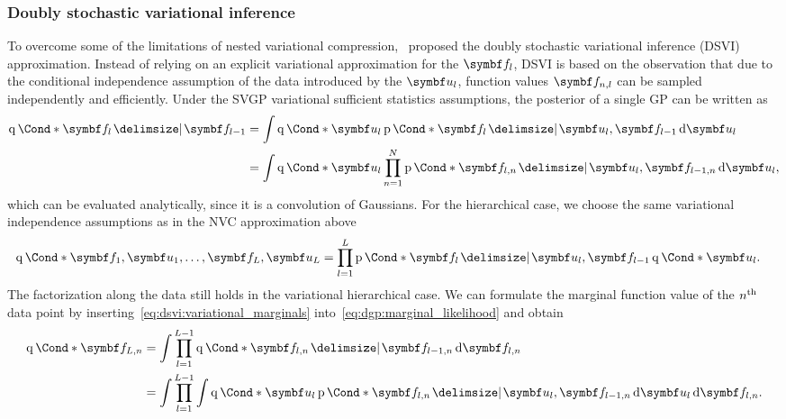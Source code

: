 \subsubsection{Doubly stochastic variational inference}
\label{toc:dsvi}
To overcome some of the limitations of nested variational compression,~\textcite{salimbeni_doubly_2017} proposed the doubly stochastic variational inference (DSVI) approximation.
Instead of relying on an explicit variational approximation for the $\mat{f}_l$, DSVI is based on the observation that due to the conditional independence assumption of the data introduced by the $\mat{u}_l$, function values $\mat{f}_{n,l}$ can be sampled independently and efficiently.
Under the SVGP variational sufficient statistics assumptions, the posterior of a single GP can be written as
\begin{equation}
    \begin{split}
        \label{eq:dsvi:variational_marginals}
        \Variat*{\mat{f}_l \given \mat{f}_{l-1}}
        &=
        \int \Variat*{\mat{u}_l}
        \Prob*{\mat{f}_l \given \mat{u}_l, \mat{f}_{l-1}}
        \diff \mat{u}_l
        \\
        &=
        \int \Variat*{\mat{u}_l}
        \prod_{n=1}^N \Prob*{\mat{f}_{l,n} \given \mat{u}_l, \mat{f}_{l-1, n}}
        \diff \mat{u}_l,
    \end{split}
\end{equation}
which can be evaluated analytically, since it is a convolution of Gaussians.
For the hierarchical case, we choose the same variational independence assumptions as in the NVC approximation above
\begin{equation}
    \begin{split}
        \label{eq:dsvi:variational_distribution}
        \Variat*{\mat{f}_1, \mat{u}_1, \dots, \mat{f}_L, \mat{u}_L}
        &= \prod_{l=1}^L \Prob*{\mat{f}_l \given \mat{u}_l, \mat{f}_{l-1}} \Variat*{\mat{u}_l}.
    \end{split}
\end{equation}
The factorization along the data still holds in the variational hierarchical case.
We can formulate the marginal function value of the $n^{\text{th}}$ data point by inserting~\cref{eq:dsvi:variational_marginals} into~\cref{eq:dgp:marginal_likelihood} and obtain
\begin{equation}
    \begin{split}
        \label{eq:dsvi:variational_layers}
        \Variat*{\mat{f}_{L,n}}
        &= \int \prod_{l=1}^{L-1} \Variat*{\mat{f}_{l,n} \given \mat{f}_{l-1,n}} \diff \mat{f}_{l, n} \\
        &= \int \prod_{l=1}^{L-1} \int \Variat*{\mat{u}_l} \Prob*{\mat{f}_{l,n} \given \mat{u}_l, \mat{f}_{l-1, n}} \diff \mat{u}_l \diff \mat{f}_{l, n}.
    \end{split}
\end{equation}
